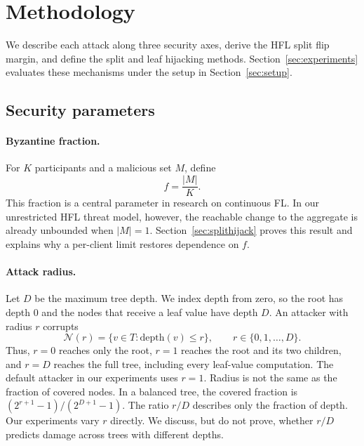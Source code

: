 \documentclass[11pt]{article}
\begin{document}
\section{Methodology}
\label{sec:methodology}

We describe each attack along three security axes, derive the HFL split flip margin, and define the split and leaf hijacking methods. Section~\ref{sec:experiments} evaluates these mechanisms under the setup in Section~\ref{sec:setup}.

\subsection{Security parameters}
\label{sec:parameters}

\paragraph{Byzantine fraction.}
For $K$ participants and a malicious set $M$, define
\begin{equation}
f = \frac{\lvert M\rvert}{K}.
\label{eq:fdef}
\end{equation}
This fraction is a central parameter in research on continuous FL. In our unrestricted HFL threat model, however, the reachable change to the aggregate is already unbounded when $\lvert M\rvert=1$. Section~\ref{sec:splithijack} proves this result and explains why a per-client limit restores dependence on $f$.

\paragraph{Attack radius.}
Let $D$ be the maximum tree depth. We index depth from zero, so the root has depth $0$ and the nodes that receive a leaf value have depth $D$. An attacker with radius $r$ corrupts
\begin{equation}
\mathcal{N}(r)=\{v\in T:\mathrm{depth}(v)\leq r\},
\qquad r\in\{0,1,\ldots,D\}.
\label{eq:rdef}
\end{equation}
Thus, $r=0$ reaches only the root, $r=1$ reaches the root and its two children, and $r=D$ reaches the full tree, including every leaf-value computation. The default attacker in our experiments uses $r=1$. Radius is not the same as the fraction of covered nodes. In a balanced tree, the covered fraction is $(2^{r+1}-1)/(2^{D+1}-1)$. The ratio $r/D$ describes only the fraction of depth. Our experiments vary $r$ directly. We discuss, but do not prove, whether $r/D$ predicts damage across trees with different depths.
\end{document}
